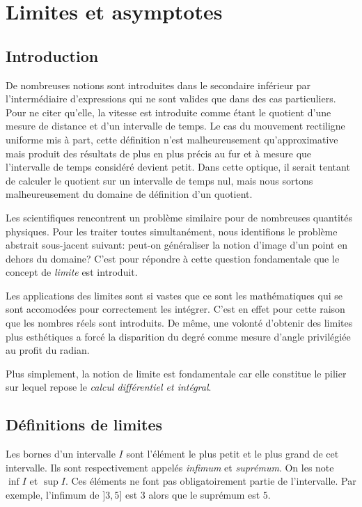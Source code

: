 \documentclass[main.tex]{subfiles}
\begin{document}
\chapter{Limites et asymptotes}

\section{Introduction}

De nombreuses notions sont introduites dans le secondaire inférieur par l'intermédiaire d'expressions
qui ne sont valides que dans des cas particuliers.
Pour ne citer qu'elle,
la vitesse est introduite comme étant le quotient d'une mesure de distance et d'un intervalle de temps.
Le cas du mouvement rectiligne uniforme mis à part,
cette définition n'est malheureusement qu'approximative
mais produit des résultats de plus en plus précis
au fur et à mesure que l'intervalle de temps considéré devient petit.
Dans cette optique,
il serait tentant de calculer le quotient sur un intervalle de temps nul,
mais nous sortons malheureusement du domaine de définition d'un quotient.

Les scientifiques rencontrent un problème similaire pour de nombreuses quantités physiques.
Pour les traiter toutes simultanément,
nous identifions le problème abstrait sous-jacent suivant:
peut-on généraliser la notion d'image d'un point en dehors du domaine?
C'est pour répondre à cette question fondamentale que le concept de \emph{limite} est introduit.

Les applications des limites sont si vastes
que ce sont les mathématiques qui se sont accomodées pour correctement les intégrer. %
C'est en effet pour cette raison que les nombres réels sont introduits.
De même,
une volonté d'obtenir des limites plus esthétiques a forcé la disparition du degré comme mesure d'angle privilégiée au profit du radian.

Plus simplement,
la notion de limite est fondamentale
car elle constitue le pilier sur lequel repose le \emph{calcul différentiel et intégral}.

\section{Définitions de limites}

Les bornes d'un intervalle $I$ sont l'élément le plus petit et le plus grand de cet intervalle.
Ils sont respectivement appelés \emph{infimum} et \emph{suprémum}.
On les note $\inf I$ et $\sup I$.
Ces éléments ne font pas obligatoirement partie de l'intervalle.
Par exemple, l'infimum de $]3, 5]$ est $3$ alors que le suprémum est $5$.
\end{document}
